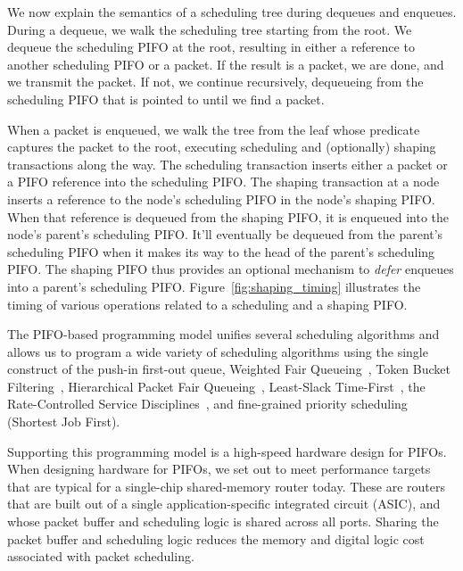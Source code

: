 We now explain the semantics of a scheduling tree during dequeues and enqueues.
During a dequeue, we walk the scheduling tree starting from the root. We
dequeue the scheduling PIFO at the root, resulting in either a reference to
another scheduling PIFO or a packet. If the result is a packet, we are done,
and we transmit the packet. If not, we continue recursively, dequeueing from
the scheduling PIFO that is pointed to until we find a packet.

When a packet is enqueued, we walk the tree from the leaf whose predicate
captures the packet to the root, executing scheduling and (optionally) shaping
transactions along the way. The scheduling transaction inserts either a packet
or a PIFO reference into the scheduling PIFO. The shaping transaction at a node
inserts a reference to the node's scheduling PIFO in the node's shaping PIFO.
When that reference is dequeued from the shaping PIFO, it is enqueued into the
node's parent's scheduling PIFO. It'll eventually be dequeued from the parent's
scheduling PIFO when it makes its way to the head of the parent's scheduling
PIFO. The shaping PIFO thus provides an optional mechanism to {\em defer}
enqueues into a parent's scheduling PIFO. Figure~\ref{fig:shaping_timing}
illustrates the timing of various operations related to a scheduling and a
shaping PIFO.

The PIFO-based programming model unifies several scheduling algorithms and
allows us to program a wide variety of scheduling algorithms using the single
construct of the push-in first-out queue, \eg Weighted Fair
Queueing~\cite{wfq}, Token Bucket Filtering~\cite{tbf}, Hierarchical Packet
Fair Queueing~\cite{hpfq}, Least-Slack Time-First~\cite{lstf}, the
Rate-Controlled Service Disciplines~\cite{rcsd}, and fine-grained priority
scheduling (\eg Shortest Job First).

 Supporting this programming model is a high-speed
hardware design for PIFOs. When designing hardware for PIFOs, we set out to
meet performance targets that are typical for a single-chip shared-memory
router today. These are routers that are built out of a single
application-specific integrated circuit (ASIC), and whose packet buffer and
scheduling logic is shared across all ports. Sharing the packet buffer and
scheduling logic reduces the memory and digital logic cost associated with
packet scheduling.

